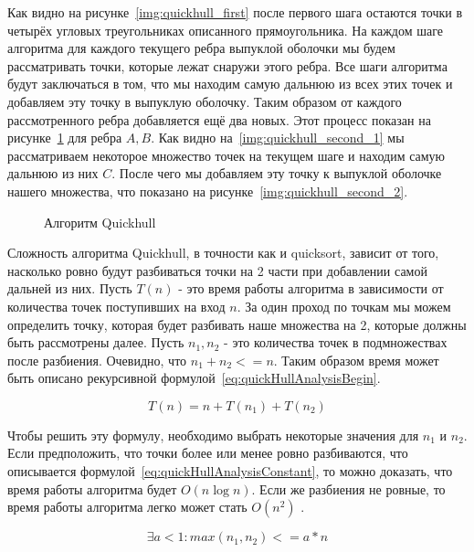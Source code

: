 Как видно на рисунке~\ref{img:quickhull_first} после первого шага остаются точки в четырёх угловых треугольниках описанного прямоугольника. На каждом шаге алгоритма для каждого текущего ребра выпуклой оболочки мы будем рассматривать точки, которые лежат снаружи этого ребра. Все шаги алгоритма будут заключаться в том, что мы находим самую дальнюю из всех этих точек и добавляем эту точку в выпуклую оболочку. Таким образом от каждого рассмотренного ребра добавляется ещё два новых. Этот процесс показан на рисунке~\ref{img:quickhull_second} для ребра $A, B$. Как видно на~\ref{img:quickhull_second_1} мы рассматриваем некоторое множество точек на текущем шаге и находим самую дальнюю из них $C$. После чего мы добавляем эту точку к выпуклой оболочке нашего множества, что показано на рисунке~\ref{img:quickhull_second_2}.

\begin{figure}[H]
	{\centering
		\hfill
		\subbottom[\label{img:quickhull_second_1}]{%
			}
		\hfill
		\subbottom[\label{img:quickhull_second_2}]{%
			}
		\hfill
	}
	\caption{Алгоритм Quickhull}
	\label{img:quickhull_second}
\end{figure}

Сложность алгоритма Quickhull, в точности как и quicksort, зависит от того, насколько ровно будут разбиваться точки на 2 части при добавлении самой дальней из них. Пусть $T(n)$ - это время работы алгоритма в зависимости от количества точек поступивших на вход $n$. За один проход по точкам мы можем определить точку, которая будет разбивать наше множества на 2, которые должны быть рассмотрены далее. Пусть $n_1, n_2$ - это количества точек в подмножествах после разбиения. Очевидно, что $n_1+n_2<=n$. Таким образом время может быть описано рекурсивной формулой~\ref{eq:quickHullAnalysisBegin}.

\begin{equation}\label{eq:quickHullAnalysisBegin}
T(n) = n + T(n_1) + T(n_2)
\end{equation}

Чтобы решить эту формулу, необходимо выбрать некоторые значения для $n_1$ и $n_2$. Если предположить, что точки более или менее ровно разбиваются, что описывается формулой~\ref{eq:quickHullAnalysisConstant}, то можно доказать, что время работы алгоритма будет $O(n \log n)$. Если же разбиения не ровные, то время работы алгоритма легко может стать $O(n^2)$ \cite{mount2000lecture}.

\begin{equation}\label{eq:quickHullAnalysisConstant}
\exists  a < 1 : max(n_1, n_2) <= a * n
\end{equation}

